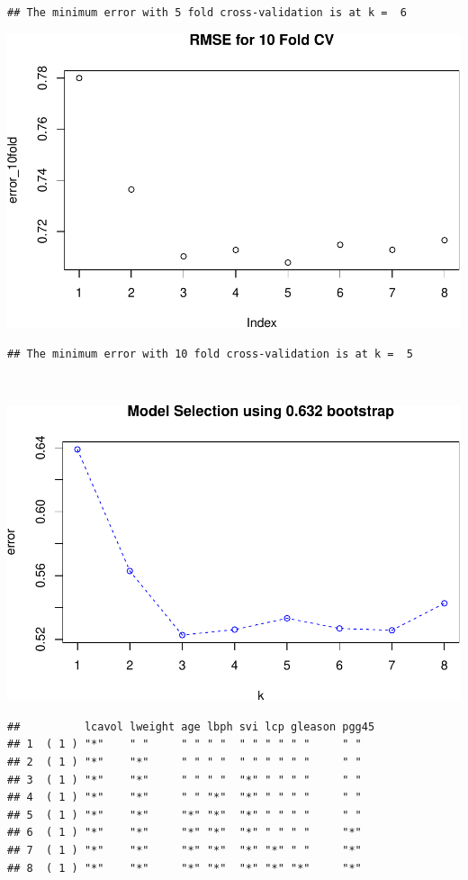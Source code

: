 \documentclass[]{article}
\begin{document}
\begin{verbatim}
## The minimum error with 5 fold cross-validation is at k =  6
\end{verbatim}

\includegraphics{HW4_Solution_files/figure-latex/unnamed-chunk-2-2.pdf}

\begin{verbatim}
## The minimum error with 10 fold cross-validation is at k =  5
\end{verbatim}

~

\includegraphics{HW4_Solution_files/figure-latex/unnamed-chunk-3-1.pdf}

\newpage

\begin{verbatim}
##          lcavol lweight age lbph svi lcp gleason pgg45
## 1  ( 1 ) "*"    " "     " " " "  " " " " " "     " "  
## 2  ( 1 ) "*"    "*"     " " " "  " " " " " "     " "  
## 3  ( 1 ) "*"    "*"     " " " "  "*" " " " "     " "  
## 4  ( 1 ) "*"    "*"     " " "*"  "*" " " " "     " "  
## 5  ( 1 ) "*"    "*"     "*" "*"  "*" " " " "     " "  
## 6  ( 1 ) "*"    "*"     "*" "*"  "*" " " " "     "*"  
## 7  ( 1 ) "*"    "*"     "*" "*"  "*" "*" " "     "*"  
## 8  ( 1 ) "*"    "*"     "*" "*"  "*" "*" "*"     "*"
\end{verbatim}
\end{document}
